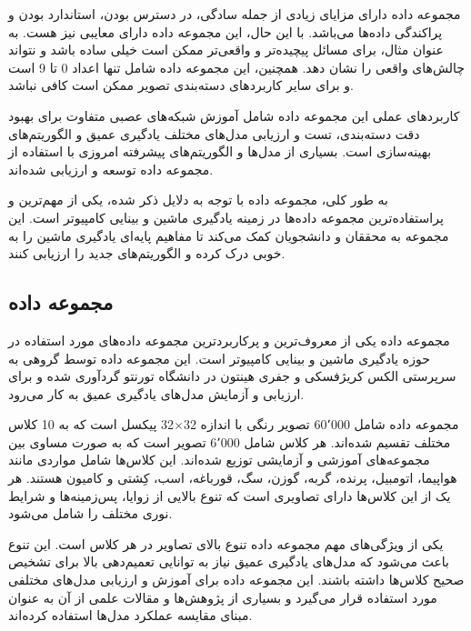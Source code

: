 مجموعه داده
دارای مزایای زیادی از جمله سادگی، در دسترس بودن، استاندارد بودن و پراکندگی داده‌ها می‌باشد. با این حال، این مجموعه داده دارای معایبی نیز هست. به عنوان مثال، برای مسائل پیچیده‌تر و واقعی‌تر ممکن است
خیلی ساده باشد و نتواند چالش‌های واقعی را نشان دهد. همچنین، این مجموعه داده شامل تنها اعداد 0 تا 9 است و برای سایر کاربردهای دسته‌بندی تصویر ممکن است کافی نباشد.

کاربردهای عملی این مجموعه داده شامل آموزش شبکه‌های عصبی متفاوت برای بهبود دقت دسته‌بندی، تست و ارزیابی مدل‌های مختلف یادگیری عمیق و الگوریتم‌های بهینه‌سازی است. بسیاری از مدل‌ها و الگوریتم‌های پیشرفته امروزی با استفاده از مجموعه داده
توسعه و ارزیابی شده‌اند.

به طور کلی، مجموعه داده
با توجه به دلایل ذکر شده، یکی از مهم‌ترین و پراستفاده‌ترین مجموعه داده‌ها در زمینه یادگیری ماشین و بینایی کامپیوتر است. این مجموعه به محققان و دانشجویان کمک می‌کند تا مفاهیم پایه‌ای یادگیری ماشین را به خوبی درک کرده و الگوریتم‌های جدید را ارزیابی کنند.


\subsection{
	مجموعه داده
}
مجموعه داده
یکی از معروف‌ترین و پرکاربردترین مجموعه داده‌های مورد استفاده در حوزه یادگیری ماشین و بینایی کامپیوتر است. این مجموعه داده توسط گروهی به سرپرستی الکس کریژفسکی%
و جفری هینتون%
در دانشگاه تورنتو گردآوری شده و برای ارزیابی و آزمایش مدل‌های یادگیری عمیق به کار می‌رود.


مجموعه داده
شامل 60٬000 تصویر رنگی با اندازه
32$\times$32
پیکسل است که به 10 کلاس مختلف تقسیم شده‌اند. هر کلاس شامل 6٬000 تصویر است که به صورت مساوی بین مجموعه‌های آموزشی و آزمایشی توزیع شده‌اند. این کلاس‌ها شامل مواردی مانند هواپیما، اتومبیل، پرنده، گربه، گوزن، سگ، قورباغه، اسب، کِشتی و کامیون هستند. هر یک از این کلاس‌ها دارای تصاویری است که تنوع بالایی از زوایا، پس‌زمینه‌ها و شرایط نوری مختلف را شامل می‌شود.

یکی از ویژگی‌های مهم مجموعه داده
تنوع بالای تصاویر در هر کلاس است. این تنوع باعث می‌شود که مدل‌های یادگیری عمیق نیاز به توانایی تعمیم‌دهی بالا برای تشخیص صحیح کلاس‌ها داشته باشند. این مجموعه داده برای آموزش و ارزیابی مدل‌های مختلفی مورد استفاده قرار می‌گیرد و بسیاری از پژوهش‌ها و مقالات علمی از آن به عنوان مبنای مقایسه عملکرد مدل‌ها استفاده کرده‌اند.

